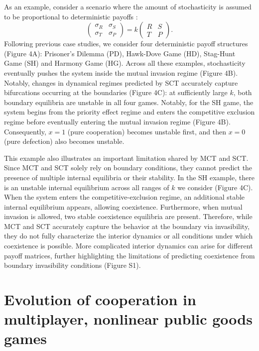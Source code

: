 \documentclass[12pt]{article}
\begin{document}
As an example, consider a scenario where the amount of stochasticity is assumed to be proportional to deterministic payoffs \citep{wang2025evolution}:
\begin{equation}
 \begin{pmatrix}
\sigma_R & \sigma_S \\
\sigma_T & \sigma_P
\end{pmatrix} =k \begin{pmatrix}
R & S \\
T & P
\end{pmatrix}.
\end{equation}
Following previous case studies, we consider four deterministic payoff structures (Figure 4A): Prisoner's Dilemma (PD), Hawk-Dove Game (HD), Stag-Hunt Game (SH) and Harmony Game (HG).
Across all these examples, stochasticity eventually pushes the system inside the mutual invasion regime (Figure 4B).
Notably, changes in dynamical regimes predicted by SCT accurately capture bifurcations occurring at the boundaries (Figure 4C): 
at sufficiently large $k$, both boundary equilibria are unstable in all four games.
Notably, for the SH game, the system begins from the priority effect regime and enters the competitive exclusion regime before eventually entering the mutual invasion regime (Figure 4B).
Consequently, $x=1$ (pure cooperation) becomes unstable first, and then $x=0$ (pure defection) also becomes unstable.

This example also illustrates an important limitation shared by MCT and SCT.
Since MCT and SCT solely rely on boundary conditions, they cannot predict the presence of multiple internal equilibria or their stability.
In the SH example, there is an unstable internal equilibrium across all ranges of $k$ we consider (Figure 4C).
When the system enters the competitive-exclusion regime, an additional stable internal equilibrium appears, allowing coexistence.
Furthermore, when mutual invasion is allowed, two stable coexistence equilibria are present.
Therefore, while MCT and SCT accurately capture the behavior at the boundary via invasibility, they do not fully characterize the interior dynamics or all conditions under which coexistence is possible.
More complicated interior dynamics can arise for different payoff matrices, further highlighting the limitations of predicting coexistence from boundary invasibility conditions (Figure S1).

\section*{Evolution of cooperation in multiplayer, nonlinear public goods games}
\end{document}
